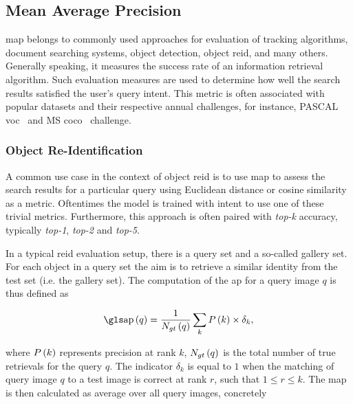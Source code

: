 \subsection{Mean Average Precision}
\label{ssec:MeanAveragePrecision}

\Gls{map} belongs to commonly used approaches for evaluation of tracking algorithms, document searching systems, object detection, object \gls{reid}, and many others. Generally speaking, it measures the success rate of an information retrieval algorithm. Such evaluation measures are used to determine how well the search results satisfied the user's query intent. This metric is often associated with popular datasets and their respective annual challenges, for instance, PASCAL \gls{voc}~\cite{Everingham10} and MS \gls{coco}~\cite{Lin2014} challenge.

\subsubsection{Object Re-Identification}
\label{sssec:ObjectReIdentification}

A common use case in the context of object \gls{reid} is to use \gls{map} to assess the search results for a particular query using Euclidean distance or cosine similarity as a metric. Oftentimes the model is trained with intent to use one of these trivial metrics. Furthermore, this approach is often paired with \emph{top-k} accuracy, typically \emph{top-1}, \emph{top-2} and \emph{top-5}.

In a typical \gls{reid} evaluation setup, there is a query set and a so-called gallery set. For each object in a query set the aim is to retrieve a similar identity from the test set (i.e. the gallery set). The computation of the \gls{ap} for a query image $q$ is thus defined as

\begin{equation}
    \label{eq:AveragePrecision}
    \func{\AP}{q} = \frac{1}{\func{N_{gt}}{q}} \sum_{k} \func{P}{k} \times {\delta}_k,
\end{equation}

\noindent where ${P} \left( k \right)$ represents precision at rank $k$, ${N_{gt}} \left( q \right)$ is the total number of true retrievals for the query $q$. The indicator ${\delta}_k$ is equal to $1$ when the matching of query image $q$ to a test image is correct at rank $r$, such that $1 \leq r \leq k$. The \gls{map} is then calculated as average over all query images, concretely

